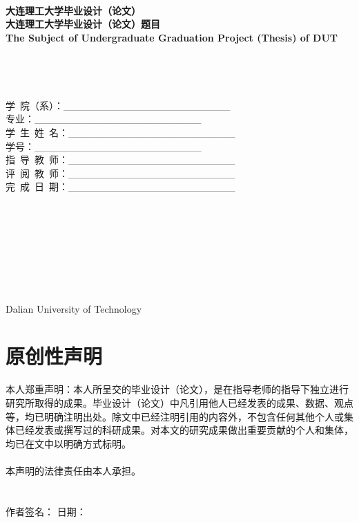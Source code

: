 \documentclass[UTF8,a4paper]{ctexart}
\numberwithin{table}{section}
\numberwithin{equation}{section}
\begin{document}
	\begin{titlepage}
		\begin{center}
			~\\[1pt]
			 {\bf{大连理工大学毕业设计（论文）}}
			~\\[12pt]
			 {\bf{大连理工大学毕业设计（论文）题目}}\\
			 {\bf{The Subject of Undergraduate Graduation Project (Thesis) of DUT}}
			~\\
			~\\
			~\\
			~\\
			~\\
			 {学\ 院（系）：\_\_\_\_\_\_\_\_\_\_\_\_\_\_\_\_\_\_\_\_\_\_\_}\\
			 {专\qquad \quad  业：\_\_\_\_\_\_\_\_\_\_\_\_\_\_\_\_\_\_\_\_\_\_\_}\\
			 {学\ 生\ 姓\ 名：\_\_\_\_\_\_\_\_\_\_\_\_\_\_\_\_\_\_\_\_\_\_\_}\\
			 {学\qquad \quad 号：\_\_\_\_\_\_\_\_\_\_\_\_\_\_\_\_\_\_\_\_\_\_\_}\\
			 {指\ 导\ 教\ 师：\_\_\_\_\_\_\_\_\_\_\_\_\_\_\_\_\_\_\_\_\_\_\_}\\
			 {评\ 阅\ 教\ 师：\_\_\_\_\_\_\_\_\_\_\_\_\_\_\_\_\_\_\_\_\_\_\_}\\
			 {完\ 成\ 日\ 期：\_\_\_\_\_\_\_\_\_\_\_\_\_\_\_\_\_\_\_\_\_\_\_}\\
			~\\
			~\\
			~\\
			~\\
			~\\
			~\\
			~\\
			{ }\\
			{ Dalian University of Technology}
		\end{center}
	\newpage
	\end{titlepage}
	
	\newpage
	
	\section*{\fontsize{22}{33} {\heiti 原创性声明}}
	{\fontsize{15pt}{22.5pt} 本人郑重声明：本人所呈交的毕业设计（论文），是在指导老师的指导下独立进行研究所取得的成果。毕业设计（论文）中凡引用他人已经发表的成果、数据、观点等，均已明确注明出处。除文中已经注明引用的内容外，不包含任何其他个人或集体已经发表或撰写过的科研成果。对本文的研究成果做出重要贡献的个人和集体，均已在文中以明确方式标明。\\
	~\\
	本声明的法律责任由本人承担。\\
	~\\
	~\\
	作者签名： \qquad \qquad \qquad \qquad \qquad \qquad 日\quad 期：}
	\newpage
\end{document}
